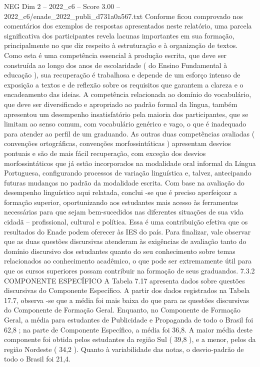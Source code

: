 \begin{textsample}{NEG Dim 2 – 2022\_c6 – Score 3.00 – 2022\_c6/enade\_2022\_publi\_d731a0a567.txt}
Conforme ficou comprovado nos comentários dos exemplos de respostas apresentados neste relatório, uma parcela significativa dos participantes revela lacunas importantes em sua formação, principalmente no que diz respeito à estruturação e à organização de textos.
Como esta é uma competência essencial à produção escrita, que deve ser construída ao longo dos anos de escolaridade ( do Ensino Fundamental à educação ), sua recuperação é trabalhosa e depende de um esforço intenso de exposição a textos e de reflexão sobre os requisitos que garantem a clareza e o encadeamento das ideias.
A competência relacionada ao domínio do vocabulário, que deve ser diversificado e apropriado ao padrão formal da língua, também apresentou um desempenho insatisfatório pela maioria dos participantes, que se limitam ao senso comum, com vocabulário genérico e vago, o que é inadequado para atender ao perfil de um graduando.
As outras duas competências avaliadas ( convenções ortográficas, convenções morfossintáticas ) apresentam desvios pontuais e são de mais fácil recuperação, com exceção dos desvios morfossintáticos que já estão incorporados na modalidade oral informal da Língua Portuguesa, configurando processos de variação linguística e, talvez, antecipando futuras mudanças no padrão da modalidade escrita.
Com base na avaliação do desempenho linguístico aqui relatada, conclui -se que é preciso aperfeiçoar a formação superior, oportunizando aos estudantes mais acesso às ferramentas necessárias para que sejam bem-sucedidos nas diferentes situações de sua vida cidadã – profissional, cultural e política.
Essa é uma contribuição efetiva que os resultados do Enade podem oferecer às IES do país.
Para finalizar, vale observar que as duas questões discursivas atenderam às exigências de avaliação tanto do domínio discursivo dos estudantes quanto do seu conhecimento sobre temas relacionados ao conhecimento acadêmico, o que pode ser extremamente útil para que os cursos superiores possam contribuir na formação de seus graduandos. 7.3.2 COMPONENTE ESPECÍFICO A Tabela 7.17 apresenta dados sobre questões discursivas do Componente Específico.
A partir dos dados registrados na Tabela 17.7, observa -se que a média foi mais baixa do que para as questões discursivas do Componente de Formação Geral.
Enquanto, no Componente de Formação Geral, a média para estudantes de Publicidade e Propaganda de todo o Brasil foi 62,8 ; na parte de Componente Específico, a média foi 36,8.
A maior média deste componente foi obtida pelos estudantes da região Sul ( 39,8 ), e a menor, pelos da região Nordeste ( 34,2 ).
Quanto à variabilidade das notas, o desvio-padrão de todo o Brasil foi 21,4.

\end{textsample}
